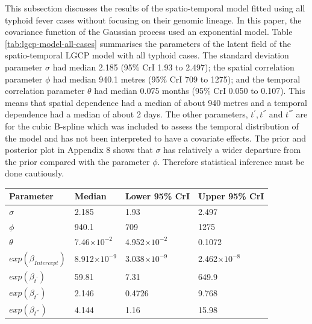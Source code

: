 This subsection discusses the results of the spatio-temporal model fitted using all typhoid fever cases without focusing on their genomic lineage. 
In this paper, the covariance function of the Gaussian process used an exponential model. 
Table \ref{tab:lgcp-model-all-cases} summarises the parameters of the latent field of the spatio-temporal LGCP model with all typhoid cases. 
The standard deviation parameter $\sigma$ had median 2.185 (95\% CrI 1.93 to 2.497); the spatial correlation parameter $\phi$ had median 940.1 metres (95\% CrI 709 to 1275); and the temporal correlation parameter $\theta$ had median 0.075 months (95\% CrI 0.050 to 0.107). 
This means that spatial dependence had a median of about 940 metres and a temporal dependence had a median of about 2 days. 
The other parameters, $t^{'}, t^{''}$ and $t^{'''}$ are for the cubic B-spline which was included to assess the temporal distribution of the model and has not been interpreted to have a covariate effects. The prior and posterior plot in Appendix 8 shows that $\sigma$ has relatively a wider departure from the prior compared with the parameter $\phi$. Therefore statistical inference must be done cautiously.

\hspace*{0.2pt}
\addtocounter{table}{-1}

\begin{spacing}{0.85}
      \label{tab:lgcp-model-all-cases}
    \begin{longtable}{p{1.3in}p{1.3in}p{1.3in}p{1.3in}}
        \toprule
        Parameter                & Median               & Lower 95\%  CrI        & Upper 95\%  CrI        \\ \midrule
        $\sigma$                 & 2.185                & 1.93                 & 2.497                \\
        $\phi$                   & 940.1                & 709                  & 1275                 \\
        $\theta$                 & 7.46$\times10^{-2}$  & 4.952$\times10^{-2}$ & 0.1072               \\
        $exp(\beta_{Intercept})$ & 8.912$\times10^{-9}$ & 3.038$\times10^{-9}$ & 2.462$\times10^{-8}$ \\
        $exp(\beta_{t^{'}})$     & 59.81                & 7.31                 & 649.9                \\
        $exp(\beta_{t^{''}})$    & 2.146                & 0.4726               & 9.768                \\
        $exp(\beta_{t^{'''}})$   & 4.144                & 1.16                 & 15.98                \\
        \bottomrule
    \end{longtable}
\end{spacing}


